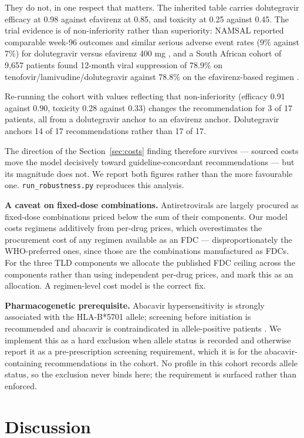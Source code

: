 \documentclass[conference]{IEEEtran}
\begin{document}
They do not, in one respect that matters. The inherited table carries dolutegravir efficacy at 0.98 against efavirenz at 0.85, and toxicity at 0.25 against 0.45. The trial evidence is of non-inferiority rather than superiority: NAMSAL reported comparable week-96 outcomes and similar serious adverse event rates (9\% against 7\%) for dolutegravir versus efavirenz 400 mg \cite{namsal2020}, and a South African cohort of 9,657 patients found 12-month viral suppression of 78.9\% on tenofovir/lamivudine/dolutegravir against 78.8\% on the efavirenz-based regimen \cite{tldcohort}.

Re-running the cohort with values reflecting that non-inferiority (efficacy 0.91 against 0.90, toxicity 0.28 against 0.33) changes the recommendation for 3 of 17 patients, all from a dolutegravir anchor to an efavirenz anchor. Dolutegravir anchors 14 of 17 recommendations rather than 17 of 17.

The direction of the Section~\ref{sec:costs} finding therefore survives --- sourced costs move the model decisively toward guideline-concordant recommendations --- but its magnitude does not. We report both figures rather than the more favourable one. \texttt{run\_\allowbreak{}robustness.py} reproduces this analysis.

\textbf{A caveat on fixed-dose combinations.} Antiretrovirals are largely procured as fixed-dose combinations priced below the sum of their components. Our model costs regimens additively from per-drug prices, which overestimates the procurement cost of any regimen available as an FDC --- disproportionately the WHO-preferred ones, since those are the combinations manufactured as FDCs. For the three TLD components we allocate the published FDC ceiling across the components rather than using independent per-drug prices, and mark this as an allocation. A regimen-level cost model is the correct fix.

\textbf{Pharmacogenetic prerequisite.} Abacavir hypersensitivity is strongly associated with the HLA-B*5701 allele; screening before initiation is recommended and abacavir is contraindicated in allele-positive patients \cite{dhhs_hlab5701}. We implement this as a hard exclusion when allele status is recorded and otherwise report it as a pre-prescription screening requirement, which it is for the abacavir-containing recommendations in the cohort. No profile in this cohort records allele status, so the exclusion never binds here; the requirement is surfaced rather than enforced.

\section{Discussion}\label{sec:discussion}
\end{document}
